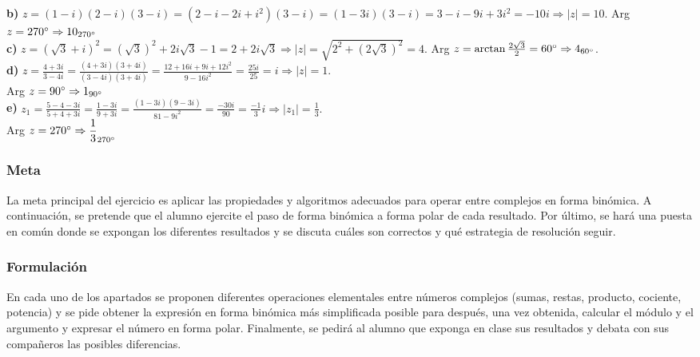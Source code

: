 \documentclass[../main.tex]{memoir}
\begin{document}
\textbf{b)} $z = (1-i)(2-i)(3-i)=(2-i-2i+i^2)(3-i)=(1-3i)(3-i)=3-i-9i+3i^2 = -10i \Rightarrow |z| = 10.$ Arg $z = 270\degree \Rightarrow 10_{270\degree}$ \\

\textbf{c)} $z = (\sqrt{3}+i)^2 = (\sqrt{3})^2 +2i \sqrt{3}-1 = 2 + 2i\sqrt{3} \Rightarrow |z| = \sqrt{2^2 + (2\sqrt{3})^2}=4.$ Arg $z = \arctan \frac{2\sqrt{3}}{2} =60\degree \Rightarrow 4_{60\degree}$. \\

\textbf{d)} $z = \displaystyle  \frac{4+3i}{3-4i} =\displaystyle \frac{(4+3i)(3+4i)}{(3-4i)(3+4i)}=\displaystyle \frac{12+16i+9i+12i^2}{9-16i^2}= \frac{25i}{25} = i \Rightarrow |z| = 1.$ \\ Arg $z = 90\degree \Rightarrow \displaystyle 1_{90\degree}$ \\

\textbf{e)} $z_1 =\displaystyle \frac{5-4-3i}{5+4+3i} = \frac{1-3i}{9+3i} = \frac{(1-3i)(9-3i)}{81-9i^2} =\displaystyle \frac{-30i}{90} =\displaystyle \frac{-1}{3}i \Rightarrow |z_1| =\displaystyle \frac{1}{3}.$  \\ Arg $z = 270\degree \Rightarrow \displaystyle \frac{1}{3}_{270\degree}$




\subsubsection{Meta}
La meta principal del ejercicio es aplicar las propiedades y algoritmos adecuados para operar entre complejos en forma binómica. A continuación, se pretende que el alumno ejercite el paso de forma binómica a forma polar de cada resultado. Por último, se hará una puesta en común donde se expongan los diferentes resultados y se discuta cuáles son correctos y qué estrategia de resolución seguir.

\subsubsection{Formulación}
En cada uno de los apartados se proponen diferentes operaciones elementales entre números complejos (sumas, restas, producto, cociente, potencia) y se pide obtener la expresión en forma binómica más simplificada posible para después, una vez obtenida, calcular el módulo y el argumento y expresar el número en forma polar. Finalmente, se pedirá al alumno que exponga en clase sus resultados y debata con sus compañeros las posibles diferencias.
\end{document}
